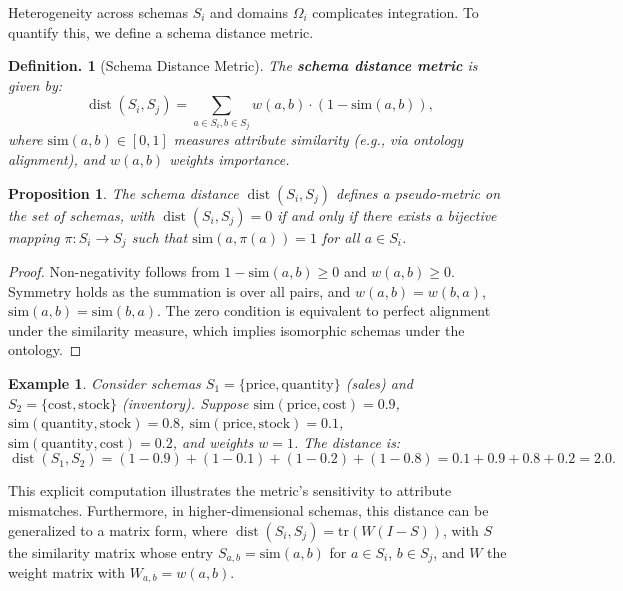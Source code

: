 \documentclass{amsart}
\newtheorem{prop}{Proposition}
\newtheorem{defn}[thm]{Definition.}
\newtheorem{exa}{Example}
\DeclareMathOperator\dist{dist}
\begin{document}
Heterogeneity across schemas \( S_i \) and domains \( \Omega_i \) complicates integration. To quantify this, we define a schema distance metric.

\begin{defn}[Schema Distance Metric]
The \textbf{schema distance metric} is given by:
\begin{equation} \label{eq:schema_distance}
\dist(S_i, S_j) = \sum_{a \in S_i, b \in S_j} w(a, b) \cdot (1 - \text{sim}(a, b)),
\end{equation}
%
where \( \text{sim}(a, b) \in [0, 1] \) measures attribute similarity (e.g., via ontology alignment), and \( w(a, b) \) weights importance. 
\end{defn}

\begin{prop}
The schema distance \( \dist(S_i, S_j) \) defines a pseudo-metric on the set of schemas, with \( \dist(S_i, S_j) = 0 \) if and only if there exists a bijective mapping \( \pi: S_i \to S_j \) such that \( \text{sim}(a, \pi(a)) = 1 \) for all \( a \in S_i \).
\end{prop}

\begin{proof}
Non-negativity follows from \( 1 - \text{sim}(a, b) \geq 0 \) and \( w(a, b) \geq 0 \). Symmetry holds as the summation is over all pairs, and \( w(a, b) = w(b, a) \), \( \text{sim}(a, b) = \text{sim}(b, a) \). The zero condition is equivalent to perfect alignment under the similarity measure, which implies isomorphic schemas under the ontology.
\end{proof}

\begin{exa}
Consider schemas \( S_1 = \{\text{price}, \text{quantity}\} \) (sales) and \( S_2 = \{\text{cost}, \text{stock}\} \) (inventory). Suppose \( \text{sim}(\text{price}, \text{cost}) = 0.9 \), \( \text{sim}(\text{quantity}, \text{stock}) = 0.8 \), \( \text{sim}(\text{price}, \text{stock}) = 0.1 \), \( \text{sim}(\text{quantity}, \text{cost}) = 0.2 \), and weights \( w = 1 \). The distance is:
\[
\dist(S_1, S_2) = (1 - 0.9) + (1 - 0.1) + (1 - 0.2) + (1 - 0.8) = 0.1 + 0.9 + 0.8 + 0.2 = 2.0.
\]
\end{exa}

This explicit computation illustrates the metric's sensitivity to attribute mismatches. Furthermore, in higher-dimensional schemas, this distance can be generalized to a matrix form, where \( \dist(S_i, S_j) = \text{tr}(W (I - S)) \), with \( S \) the similarity matrix whose entry \( S_{a,b} = \text{sim}(a,b) \) for \( a \in S_i \), \( b \in S_j \), and \( W \) the weight matrix with \( W_{a,b} = w(a,b) \).
\end{document}
